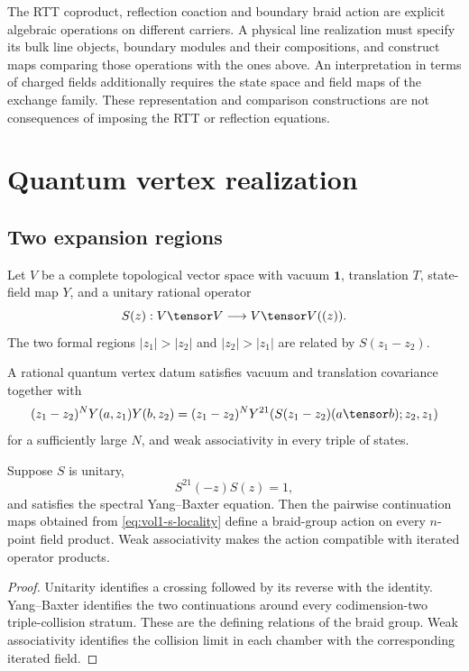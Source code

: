 The RTT coproduct, reflection coaction and boundary braid action are
explicit algebraic operations on different carriers.
A physical line realization must specify its bulk line objects, boundary
modules and their compositions, and construct maps comparing those
operations with the ones above.
An interpretation in terms of charged fields additionally requires the
state space and field maps of the exchange family.
These representation and comparison constructions are not consequences
of imposing the RTT or reflection equations.

\chapter{Quantum vertex realization}
\section{Two expansion regions}
Let $V$ be a complete topological vector space with vacuum $\mathbf1$, translation $T$, state-field map $Y$, and a unitary rational operator
\[
 S(z):V\tensor V\longrightarrow V\tensor V((z)).
\]
The two formal regions $|z_1|>|z_2|$ and $|z_2|>|z_1|$ are related by $S(z_1-z_2)$.

\begin{definition}
A rational quantum vertex datum satisfies vacuum and translation covariance together with
\begin{equation}\label{eq:vol1-s-locality}
 (z_1-z_2)^N Y(a,z_1)Y(b,z_2)
 =(z_1-z_2)^N
 Y^{21}\!\left(S(z_1-z_2)(a\tensor b);z_2,z_1\right)
\end{equation}
for a sufficiently large $N$, and weak associativity in every triple of states.
\end{definition}

\begin{theorem}
Suppose $S$ is unitary,
\[
 S^{21}(-z)S(z)=1,
\]
and satisfies the spectral Yang--Baxter equation.  Then the pairwise continuation maps obtained from \eqref{eq:vol1-s-locality} define a braid-group action on every $n$-point field product.  Weak associativity makes the action compatible with iterated operator products.
\end{theorem}
\begin{proof}
Unitarity identifies a crossing followed by its reverse with the identity.  Yang--Baxter identifies the two continuations around every codimension-two triple-collision stratum.  These are the defining relations of the braid group.  Weak associativity identifies the collision limit in each chamber with the corresponding iterated field.
\end{proof}

